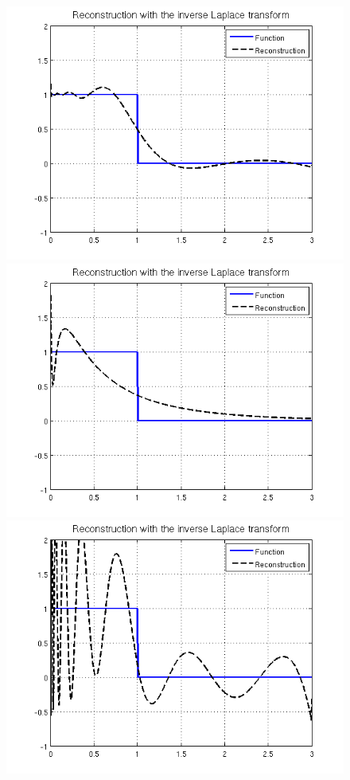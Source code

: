\documentclass[12pt,a4]{article}
\begin{document}
\begin{figure}[h!]
\begin{center}
\includegraphics[scale=.5]{img/reconstruction.png}
\includegraphics[scale=.4]{img/reconstruction_large.png}
\includegraphics[scale=.4]{img/reconstruction_small.png}

\end{center}
\end{figure}
\end{document}
